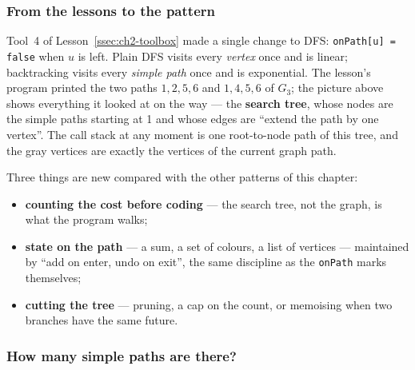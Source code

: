 \subsubsection*{From the lessons to the pattern}

Tool~4 of Lesson~\ref{ssec:ch2-toolbox} made a single change to DFS: \texttt{onPath[u] = false} when $u$ is left. Plain DFS visits every \emph{vertex} once and is linear; backtracking visits every \emph{simple path} once and is exponential. The lesson's program printed the two paths $1, 2, 5, 6$ and $1, 4, 5, 6$ of $G_3$; the picture above shows everything it looked at on the way --- the \textbf{search tree}, whose nodes are the simple paths starting at 1 and whose edges are ``extend the path by one vertex''. The call stack at any moment is one root-to-node path of this tree, and the gray vertices are exactly the vertices of the current graph path.

Three things are new compared with the other patterns of this chapter:
\begin{itemize}[leftmargin=*]
    \item \textbf{counting the cost before coding} --- the search tree, not the graph, is what the program walks;
    \item \textbf{state on the path} --- a sum, a set of colours, a list of vertices --- maintained by ``add on enter, undo on exit'', the same discipline as the \texttt{onPath} marks themselves;
    \item \textbf{cutting the tree} --- pruning, a cap on the count, or memoising when two branches have the same future.
\end{itemize}

\subsubsection*{How many simple paths are there?}

